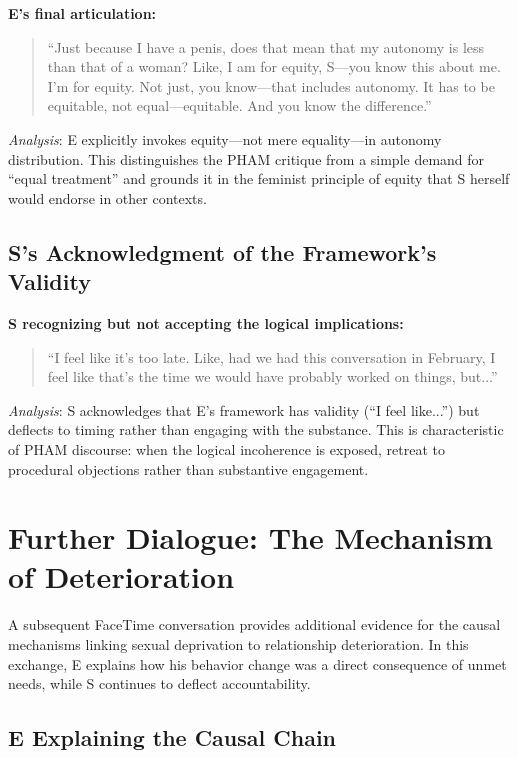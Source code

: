 \documentclass[12pt,openany]{book}
\numberwithin{equation}{chapter}
\begin{document}
\textbf{E's final articulation:}
\begin{quote}
``Just because I have a penis, does that mean that my autonomy is less than that of a woman? Like, I am for equity, S---you know this about me. I'm for equity. Not just, you know---that includes autonomy. It has to be equitable, not equal---equitable. And you know the difference.''
\end{quote}

\textit{Analysis}: E explicitly invokes equity---not mere equality---in autonomy distribution. This distinguishes the PHAM critique from a simple demand for ``equal treatment'' and grounds it in the feminist principle of equity that S herself would endorse in other contexts.

\subsection{S's Acknowledgment of the Framework's Validity}

\textbf{S recognizing but not accepting the logical implications:}
\begin{quote}
``I feel like it's too late. Like, had we had this conversation in February, I feel like that's the time we would have probably worked on things, but...''
\end{quote}

\textit{Analysis}: S acknowledges that E's framework has validity (``I feel like...'') but deflects to timing rather than engaging with the substance. This is characteristic of PHAM discourse: when the logical incoherence is exposed, retreat to procedural objections rather than substantive engagement.

\section{Further Dialogue: The Mechanism of Deterioration}

A subsequent FaceTime conversation provides additional evidence for the causal mechanisms linking sexual deprivation to relationship deterioration. In this exchange, E explains how his behavior change was a direct consequence of unmet needs, while S continues to deflect accountability.

\subsection{E Explaining the Causal Chain}
\end{document}
